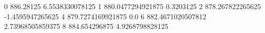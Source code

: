 0 886.28125 6.5538330078125
1 880.0477294921875 0.3203125
2 878.267822265625 -1.4595947265625
4 879.7274169921875 0.0
6 882.4671020507812 2.73968505859375
8 884.654296875 4.9268798828125
